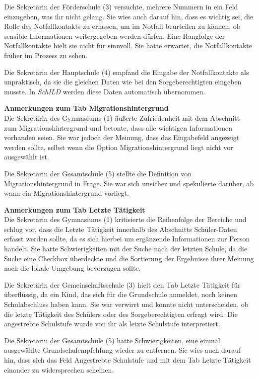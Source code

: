 Die Sekretärin der Förderschule (3) versuchte, mehrere Nummern in ein Feld einzugeben, was ihr nicht gelang. Sie wies auch darauf hin, dass es wichtig sei, die Rolle des Notfallkontakts zu erfassen, um im Notfall beurteilen zu können, ob sensible Informationen weitergegeben werden dürfen. Eine Rangfolge der Notfallkontakte hielt sie nicht für sinnvoll. Sie hätte erwartet, die Notfallkontakte früher im Prozess zu sehen.

Die Sekretärin der Hauptschule (4) empfand die Eingabe der Notfallkontakte als unpraktisch, da sie die gleichen Daten wie bei den Sorgeberechtigten eingeben musste. In \textit{SchILD} werden diese Daten automatisch übernommen.

\textbf{Anmerkungen zum Tab \glqq Migrationshintergrund\grqq{}}\\
Die Sekretärin des Gymnasiums (1) äußerte Zufriedenheit mit dem Abschnitt zum Migrationshintergrund und betonte, dass alle wichtigen Informationen vorhanden seien. Sie war jedoch der Meinung, dass das Eingabefeld angezeigt werden sollte, selbst wenn die Option \glqq Migrationshintergrund liegt nicht vor\grqq{} ausgewählt ist.

Die Sekretärin der Gesamtschule (5) stellte die Definition von \glqq Migrationshintergrund\grqq{} in Frage. Sie war sich unsicher und spekulierte darüber, ab wann ein Migrationshintergrund vorliegt.

\textbf{Anmerkungen zum Tab \glqq Letzte Tätigkeit\grqq{}}\\
Die Sekretärin des Gymnasiums (1) kritisierte die Reihenfolge der Bereiche und schlug vor, dass die \glqq Letzte Tätigkeit\grqq{} innerhalb des Abschnitts \glqq Schüler-Daten\grqq{} erfasst werden sollte, da es sich hierbei um ergänzende Informationen zur Person handelt. Sie hatte Schwierigkeiten mit der Suche nach der letzten Schule, da die Suche eine Checkbox überdeckte und die Sortierung der Ergebnisse ihrer Meinung nach die lokale Umgebung bevorzugen sollte.

Die Sekretärin der Gemeinschaftsschule (3) hielt den Tab \glqq Letzte Tätigkeit\grqq{} für überflüssig, da ein Kind, das sich für die Grundschule anmeldet, noch keinen Schulabschluss haben kann. Sie war verwirrt und konnte nicht unterscheiden, ob die letzte Tätigkeit des Schülers oder des Sorgeberechtigten erfragt wird. Die angestrebte Schulstufe wurde von ihr als letzte Schulstufe interpretiert.

Die Sekretärin der Gesamtschule (5) hatte Schwierigkeiten, eine einmal ausgewählte Grundschulempfehlung wieder zu entfernen. Sie wies auch darauf hin, dass sich das Feld \glqq Angestrebte Schulstufe\grqq{} und mit dem Tab \glqq Letzte Tätigkeit\grqq{} einander zu widersprechen scheinen.

